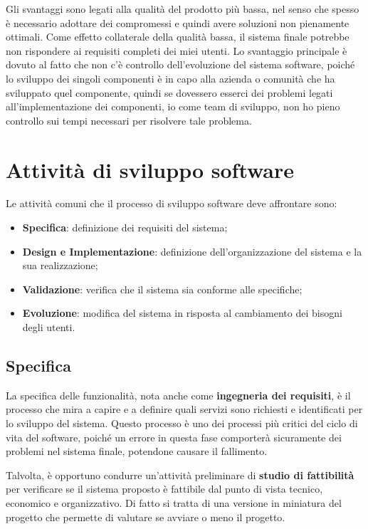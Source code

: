 Gli svantaggi sono legati alla qualità del prodotto più bassa, nel senso che spesso è 
necessario adottare dei compromessi e quindi avere soluzioni non pienamente ottimali.
Come effetto collaterale della qualità bassa, il sistema finale potrebbe non rispondere 
ai requisiti completi dei miei utenti.
Lo svantaggio principale è dovuto al fatto che non c'è controllo dell'evoluzione del 
sistema software, poiché lo sviluppo dei singoli componenti è in capo alla azienda o 
comunità che ha sviluppato quel componente, quindi se dovessero esserci dei problemi 
legati all'implementazione dei componenti, io come team di sviluppo, non ho pieno
controllo sui tempi necessari per risolvere tale problema.

\section{Attività di sviluppo software}
Le attività comuni che il processo di sviluppo software deve affrontare sono:
\begin{itemize}
  \item \textbf{Specifica}: definizione dei requisiti del sistema;
  \item \textbf{Design e Implementazione}: definizione dell'organizzazione del sistema e
  la sua realizzazione;
  \item \textbf{Validazione}: verifica che il sistema sia conforme alle specifiche;
  \item \textbf{Evoluzione}: modifica del sistema in risposta al cambiamento 
  dei bisogni degli utenti.
\end{itemize}
\subsection{Specifica}
La specifica delle funzionalità, nota anche come \textbf{ingegneria dei requisiti},
è il processo che mira a capire e a definire quali servizi sono richiesti e identificati 
per lo sviluppo del sistema. 
Questo processo è uno dei processi più critici del ciclo di vita del software, poiché
un errore in questa fase comporterà sicuramente dei problemi nel sistema finale, potendone 
causare il fallimento. 

Talvolta, è opportuno condurre un'attività preliminare di \textbf{studio di fattibilità}
per verificare se il sistema proposto è fattibile dal punto di vista tecnico, economico
e organizzativo. Di fatto si tratta di una versione in miniatura del progetto che 
permette di valutare se avviare o meno il progetto.

